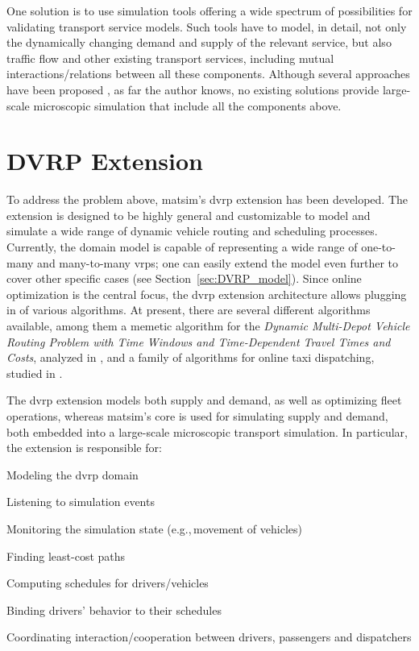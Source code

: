 One solution is to use simulation tools offering a wide spectrum of possibilities for validating transport service models. Such tools have to model, in detail, not only the dynamically changing demand and supply of the relevant service, but also traffic flow and other existing transport services, including mutual interactions/relations between all these components. Although several approaches have been proposed \citep[e.g.,][]{ReganMahmassaniJaillet1998DynamicFleetManagementSimulation, BarceloEtc2007RoutingSchedulingSimulationLogistics, LiaoEtc2008ObjOrFramework4DVRP,Certicky:2014:AST:2615731.2616118}, as far the author knows, no existing solutions provide large-scale microscopic simulation that include all the components above.

\section{DVRP Extension}
To address the problem above, \gls{matsim}'s \gls{dvrp} \gls{extension} has been developed. The \gls{extension} is designed to be highly general and customizable to model and simulate a wide range of dynamic vehicle routing and scheduling processes. Currently, the domain model is capable of representing a wide range of one-to-many and many-to-many \glspl{vrp}; one can easily extend the model even further to cover other specific cases (see Section~\ref{sec:DVRP_model}). Since online optimization is the central focus, the \gls{dvrp} extension architecture allows plugging in of various algorithms. At present, there are several different algorithms available, among them a memetic  algorithm for the \emph{Dynamic Multi-Depot Vehicle Routing Problem with Time Windows and Time-Dependent Travel Times and Costs}, analyzed in \citep{MaciejewskiNagel2012DVRPMatsimPPAM}, and a family of algorithms for online taxi dispatching, studied in \citep{ MaciejewskiNagelOnlineTaxis2, MaciejewskiNagel2013OnlineTaxisVSPWP, MaciejewskiNagel2013CooperationPPAM, Maciejewski2014OnlineViaOffline}.

The \gls{dvrp} extension models both supply and demand, as well as optimizing fleet operations, whereas \gls{matsim}'s core is used for simulating supply and demand, both embedded into a large-scale microscopic transport simulation. In particular, the extension is responsible for:
%
\begin{compactitem}
	\item Modeling the \gls{dvrp} domain
	\item Listening to simulation events
	\item Monitoring the simulation state (e.g.,\,movement of vehicles)
	\item Finding least-cost paths
	\item Computing schedules for drivers/vehicles
	\item Binding drivers' behavior to their schedules
	\item Coordinating interaction/cooperation between drivers, passengers and dispatchers
\end{compactitem}


